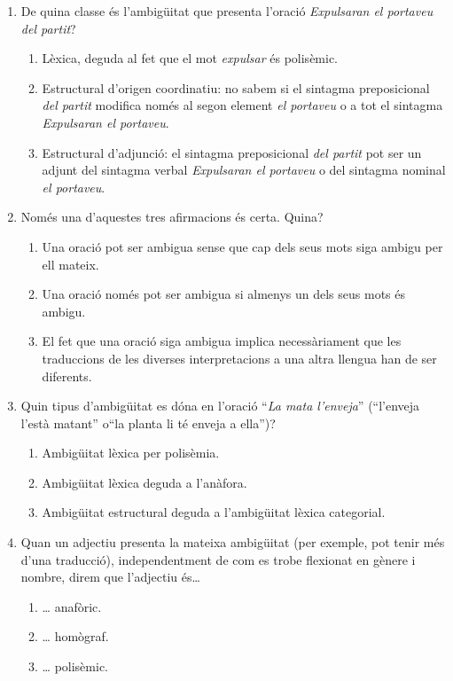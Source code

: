 \begin{enumerate}
\item De quina classe és l'ambigüitat que presenta l'oració
  \emph{Expulsaran el portaveu del partit}?
  \begin{enumerate}
  \item Lèxica, deguda al fet que el mot \emph{expulsar} és polisèmic.
  \item Estructural d'origen coordinatiu: no sabem si el sintagma
    preposicional \emph{del partit} modifica només al segon element
    \emph{el portaveu} o a tot el sintagma \emph{Expulsaran el
      portaveu}.
  \item Estructural d'adjunció: el sintagma preposicional \emph{del
      partit} pot ser un adjunt del sintagma verbal \emph{Expulsaran
      el portaveu} o del sintagma nominal \emph{el portaveu}.
  \end{enumerate}

\item Només una d'aquestes tres afirmacions és certa. Quina?
  \begin{enumerate}
  \item Una oració pot ser ambigua sense que cap dels seus mots siga
    ambigu per ell mateix.
  \item Una oració només pot ser ambigua si almenys un dels seus mots
    és ambigu.
  \item El fet que una oració siga ambigua implica necessàriament que
    les traduccions de les diverses interpretacions a una altra
    llengua han de ser diferents.
  \end{enumerate}

\item Quin tipus d'ambigüitat es dóna en l'oració ``\emph{La mata
    l'enveja}'' (``l'enveja l'està matant'' o``la planta li té enveja
  a ella'')?
  \begin{enumerate}
  \item Ambigüitat lèxica per polisèmia.
  \item Ambigüitat lèxica deguda a l'anàfora.
  \item Ambigüitat estructural deguda a l'ambigüitat lèxica
    categorial.
  \end{enumerate}

\item Quan un adjectiu presenta la mateixa ambigüitat (per exemple,
  pot tenir més d'una traducció), independentment de com es trobe
  flexionat en gènere i nombre, direm que l'adjectiu és{\ldots}
  \begin{enumerate}
  \item {\ldots} anafòric.
  \item {\ldots} homògraf.
  \item {\ldots} polisèmic.
  \end{enumerate}
  
\end{enumerate}

